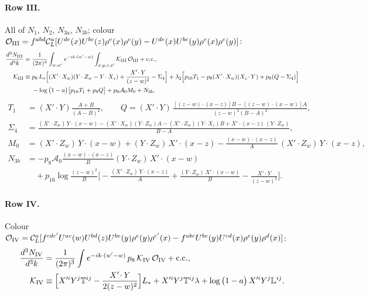 \documentclass[10pt]{article}
\numberwithin{equation}{section}
\newcommand{\Ls}{L_{*}}
\newcommand{\CL}{\mathcal C_L}
\newcommand{\OO}{\mathcal O}
\newcommand{\KK}{\mathcal K}
\newcommand{\pre}{\frac{1}{(2\pi)^3}}
\newcommand{\phw}{e^{-ik\cdot(w'-w)}}
\newcommand{\la}{\log\big(1-a\big)}
\begin{document}
\paragraph{Row III.} All of $N_1$, $N_2$, $N_{3a}$, $N_{3b}$; colour $\OO_{\rm III}=f^{abd}\CL^a[U^{de}(x)U^{bc}(z)\rho^e(x)\rho^c(y)-U^{de}(x)U^{bc}(y)\rho^e(x)\rho^c(y)]$:
\begin{align}
\frac{d^3N_{\rm III}}{d^3k}={}&\pre\int_{w,w'}\phw\int_{x,y,z,x'}\KK_{\rm III}\,\OO_{\rm III}+{\rm c.c.},\label{eq:III}\\
\KK_{\rm III}\equiv{}&p_8\,\Ls\Big[(X'\!\cdot X_w)(Y\!\cdot Z_w-Y\!\cdot X_z)+\frac{X'\!\cdot Y}{(z-w)^2}-\Sigma_4\Big]+\lambda_2\Big[p_{16}T_1-p_8(X'\!\cdot X_w)(X_z\!\cdot Y)+p_8(Q-\Sigma_4)\Big]\notag\\
&-\la\big[p_{16}T_1+p_8Q\big]+p_8\mathcal A_0M_0+N_{3b},\notag
\end{align}
\begin{align*}
T_1&=(X'\!\cdot Y)\frac{A+B}{(A-B)^2},\qquad Q=(X'\!\cdot Y)\,\frac{[(z-w)\cdot(x-z)]B-[(z-w)\cdot(x-w)]A}{(z-w)^2(B-A)^2},\\
\Sigma_4&=\frac{(X'\!\cdot Z_w)\,Y\!\cdot(x-w)-(X'\!\cdot X_w)(Y\!\cdot Z_w)A-(X'\!\cdot Z_w)(Y\!\cdot X_z)B+X'\!\cdot(x-z)\,(Y\!\cdot Z_w)}{B-A},\\
M_0&=(X'\!\cdot Z_w)\,Y\!\cdot(x-w)+(Y\!\cdot Z_w)\,X'\!\cdot(x-z)-\frac{(x-w)\cdot(x-z)}{A}\,(X'\!\cdot Z_w)\,Y\!\cdot(x-z),\\
N_{3b}&=-p_8\mathcal A_0\frac{(x-w)\cdot(x-z)}{B}(Y\!\cdot Z_w)\,X'\!\cdot(x-w)\\&\quad+p_{16}\log\frac{(z-w)^2}{B}\Big[-\frac{(X'\!\cdot Z_w)\,Y\!\cdot(x-z)}{A}+\frac{(Y\!\cdot Z_w)\,X'\!\cdot(x-w)}{B}-\frac{X'\!\cdot Y}{(z-w)^2}\Big].
\end{align*}

\paragraph{Row IV.} Colour $\OO_{\rm IV}=\CL^a[f^{cdc'}U^{ac}(w)U^{bd}(z)U^{be}(y)\rho^e(y)\rho^{c'}(x)-f^{abc}U^{be}(y)U^{cd}(x)\rho^e(y)\rho^d(x)]$:
\begin{equation}
\begin{aligned}\frac{d^3N_{\rm IV}}{d^3k}&=\pre\int\phw\,p_8\,\KK_{\rm IV}\,\OO_{\rm IV}+{\rm c.c.},\\\KK_{\rm IV}&\equiv\Big[X'^iY^j\mathbb T^{ij}-\frac{X'\!\cdot Y}{2(z-w)^2}\Big]\Ls+X'^iY^j\mathbb T^{ij}\lambda+\la\,X'^iY^j\mathbb L^{ij}.\end{aligned}
\label{eq:IV}
\end{equation}
\end{document}
